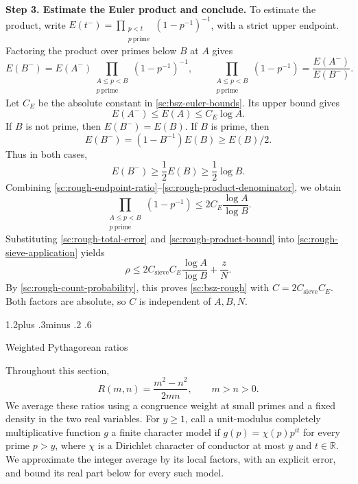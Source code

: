 \documentclass[twoside]{aomart}
\makeatletter
\theoremstyle{paperplain}
\theoremstyle{paperdefinition}
\renewcommand\section{\@startsection{section}{1}{\z@}
  {1.2\baselineskip plus .3\baselineskip minus .2\baselineskip}
  {.6\baselineskip}{\normalfont\large\bfseries\raggedright}}
\renewenvironment{proof}[1][\proofname]{\par\pushQED{\qed}%
  \normalfont\topsep6\p@\@plus3\p@\relax\trivlist
  \item[\hskip\labelsep\itshape #1\@addpunct{.}]\ignorespaces
}{\popQED\endtrivlist\@endpefalse}
\newcommand{\R}{\mathbb R}
\numberwithin{equation}{section}
\makeatother
\begin{document}
\begin{proof}
\medskip
\noindent\textbf{Step 3. Estimate the Euler product and conclude.}
To estimate the product, write
$\displaystyle E(t^-)=\prod_{\substack{p<t\\p\ \mathrm{prime}}}(1-p^{-1})^{-1}$, with a strict upper endpoint.
Factoring the product over primes below $B$ at $A$ gives
\begin{equation}
 E(B^-)=E(A^-)\prod_{\substack{A\le p<B\\p\ \mathrm{prime}}}(1-p^{-1})^{-1},\qquad \prod_{\substack{A\le p<B\\p\ \mathrm{prime}}}(1-p^{-1})=\frac{E(A^-)}{E(B^-)}.
 \label{sc:rough-endpoint-ratio}
\end{equation}
Let $C_E$ be the absolute constant in \eqref{sc:bsz-euler-bounds}.
Its upper bound gives
\begin{equation*}
 E(A^-)\le E(A)\le C_E\log A.
\end{equation*}
If $B$ is not prime, then $E(B^-)=E(B)$. If $B$ is prime, then
$$E(B^-)=(1-B^{-1})E(B)\ge E(B)/2.$$ Thus in both cases,
\begin{equation}
 E(B^-)\ge\frac12E(B)\ge\frac12\log B.
 \label{sc:rough-product-denominator}
\end{equation}
Combining \eqref{sc:rough-endpoint-ratio}--\eqref{sc:rough-product-denominator},
we obtain
\begin{equation}
 \prod_{\substack{A\le p<B\\p\ \mathrm{prime}}}(1-p^{-1})
 \le 2C_E\frac{\log A}{\log B}.
 \label{sc:rough-product-bound}
\end{equation}
Substituting \eqref{sc:rough-total-error} and
\eqref{sc:rough-product-bound} into \eqref{sc:rough-sieve-application} yields
\begin{equation*}
 \rho\le2C_{\mathrm{sieve}}C_E\frac{\log A}{\log B}+\frac zN.
\end{equation*}
By \eqref{sc:rough-count-probability}, this proves
\eqref{sc:bsz-rough} with $C=2C_{\mathrm{sieve}}C_E$.
Both factors are absolute, so $C$ is independent of $A,B,N$.
\end{proof}

\section{Weighted Pythagorean ratios}
\label{ar:section}

Throughout this section,
\begin{equation*}
 R(m,n)=\frac{m^2-n^2}{2mn},
 \qquad m>n>0.
\end{equation*}
We average these ratios using a congruence weight at small primes
and a fixed density in the two real variables. For $y\ge1$, call a
unit-modulus completely multiplicative function $g$ a finite
character model if $g(p)=\chi(p)p^{it}$ for every prime $p>y$,
where $\chi$ is a Dirichlet character of conductor at most $y$
and $t\in\R$.
We approximate the integer average by its local factors, with an
explicit error, and bound its real part below for every such model.
\end{document}
